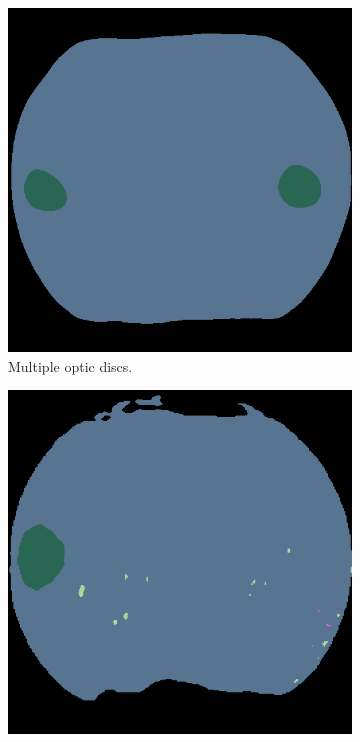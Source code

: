 \begin{figure}[h]
    \centering
    \begin{subfigure}[t]{0.19\textwidth}
        \centering
        \includegraphics[width=\linewidth]{labels/figs/two-od.png}
        \caption{Multiple optic discs.}
        \label{fig:two_od}
    \end{subfigure} %
    \hfill
    \begin{subfigure}[t]{0.19\textwidth}
        \centering
        \includegraphics[width=\linewidth]{labels/figs/malformed-fundus.png}

\end{subfigure}
\end{figure}
